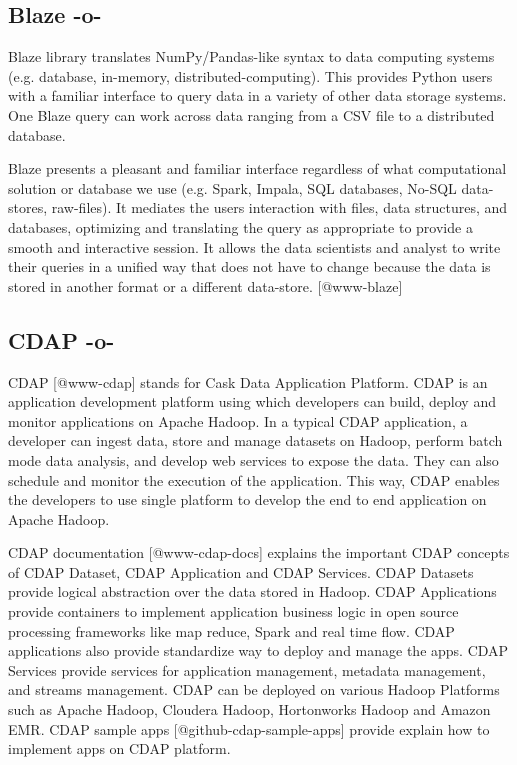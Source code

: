 \subsection{Blaze -o-}

Blaze library translates NumPy/Pandas-like syntax to data computing
systems (e.g. database, in-memory, distributed-computing). This
provides Python users with a familiar interface to query data in a
variety of other data storage systems.  One Blaze query can work
across data ranging from a CSV file to a distributed database.

Blaze presents a pleasant and familiar interface regardless of what
computational solution or database we use (e.g. Spark, Impala, SQL
databases, No-SQL data-stores, raw-files). It mediates the users
interaction with files, data structures, and databases, optimizing and
translating the query as appropriate to provide a smooth and
interactive session. It allows the data scientists and analyst to
write their queries in a unified way that does not have to change
because the data is stored in another format or a different
data-store. [@www-blaze]

\subsection{CDAP -o-}

CDAP [@www-cdap] stands for Cask Data Application Platform. CDAP
is an application development platform using which developers can
build, deploy and monitor applications on Apache Hadoop. In a typical
CDAP application, a developer can ingest data, store and manage
datasets on Hadoop, perform batch mode data analysis, and develop web
services to expose the data.  They can also schedule and monitor the
execution of the application. This way, CDAP enables the developers to
use single platform to develop the end to end application on Apache
Hadoop.

CDAP documentation [@www-cdap-docs] explains the important CDAP
concepts of CDAP Dataset, CDAP Application and CDAP Services. CDAP
Datasets provide logical abstraction over the data stored in
Hadoop. CDAP Applications provide containers to implement application
business logic in open source processing frameworks like map reduce,
Spark and real time flow. CDAP applications also provide standardize
way to deploy and manage the apps. CDAP Services provide services for
application management, metadata management, and streams management.
CDAP can be deployed on various Hadoop Platforms such as Apache
Hadoop, Cloudera Hadoop, Hortonworks Hadoop and Amazon EMR.  CDAP
sample apps [@github-cdap-sample-apps] provide explain how to
implement apps on CDAP platform.

